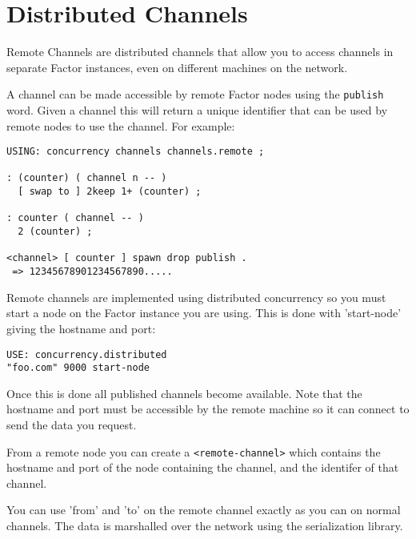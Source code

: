 \chapter{Distributed Channels}\label{dchannels}

Remote Channels are distributed channels that allow you to access
channels in separate Factor instances, even on different machines on
the network. 


A channel can be made accessible by remote Factor nodes using the
\texttt{publish} word. Given a channel this will return a unique
identifier that can be used by remote nodes to use the channel. For
example:

\begin{verbatim}
USING: concurrency channels channels.remote ;

: (counter) ( channel n -- )
  [ swap to ] 2keep 1+ (counter) ;
    
: counter ( channel -- )
  2 (counter) ;    

<channel> [ counter ] spawn drop publish .
 => 12345678901234567890.....
\end{verbatim}

Remote channels are implemented using
distributed concurrency so you must start a node on the Factor
instance you are using. This is done with 'start-node' giving the
hostname and port:


\begin{verbatim}
USE: concurrency.distributed
"foo.com" 9000 start-node
\end{verbatim}

Once this is done all published channels become available. Note that
the hostname and port must be accessible by the remote machine so it
can connect to send the data you request.

From a remote node you can create a \texttt{<remote-channel>} which contains
the hostname and port of the node containing the channel, and the identifer
of that channel.

You can use 'from' and 'to' on the remote channel exactly as you can
on normal channels. The data is marshalled over the network using the
serialization library.  

